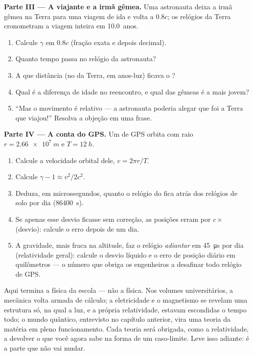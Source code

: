 \begin{problem}
\medskip
\noindent\textbf{Parte III --- A viajante e a irmã gêmea.}
Uma astronauta deixa a irmã gêmea na Terra para uma viagem de ida e volta a $0.8c$; os
relógios da Terra cronometram a viagem inteira em \qty{10.0}{anos}.
\begin{enumerate}[resume]
  \item Calcule $\gamma$ em $0.8c$ (fração exata e depois decimal).
  \item Quanto tempo passa no relógio da astronauta?
  \item A que distância (no  da Terra, em anos-luz) ficava o ?
  \item Qual é a diferença de idade no reencontro, e qual das gêmeas é a mais jovem?
  \item ``Mas o movimento é relativo --- a astronauta poderia alegar que foi a Terra que
        viajou!'' Resolva a objeção em uma frase.
\end{enumerate}

\medskip
\noindent\textbf{Parte IV --- A conta do GPS.}
Um  de GPS orbita com raio $r = \qty{2.66e7}{m}$ e  $T = \qty{12}{h}$.
\begin{enumerate}[resume]
  \item Calcule a velocidade orbital dele, $v = 2\pi r/T$.
  \item Calcule $\gamma - 1 \approx v^2/2c^2$.
  \item Deduza, em microssegundos, quanto o relógio do  fica atrás dos relógios
        de solo por dia (\qty{86400}{s}).
  \item Se apenas esse desvio ficasse sem correção, as posições erram por
        $c \times$ (desvio): calcule o erro depois de um dia.
  \item A gravidade, mais fraca na altitude, faz o relógio \emph{adiantar} em
        \qty{45}{\micro s} por dia (relatividade geral): calcule o desvio líquido e o
        erro de posição diário em quilômetros --- o número que obriga os engenheiros a
        desafinar todo relógio de GPS.
\end{enumerate}
\end{problem}

\bigskip
\noindent
Aqui termina a física da escola --- não a física. Nos volumes universitários, a mecânica
volta armada de cálculo; a eletricidade e o magnetismo se revelam uma estrutura só, na
qual a luz, e a própria relatividade, estavam escondidas o tempo todo; o mundo quântico,
entrevisto no capítulo anterior, vira uma teoria da matéria em pleno funcionamento. Cada
teoria será obrigada, como a relatividade, a devolver o que você agora sabe na forma de
um caso-limite. Leve isso adiante: é a parte que não vai mudar.
